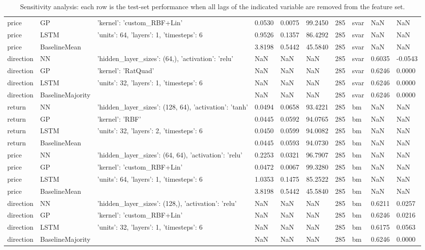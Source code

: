 \begin{table}[H]
\begin{tabular}{llllllllll}
price & GP & {'kernel': 'custom_RBF+Lin'} & 0.0530 & 0.0075 & 99.2450 & 285 & svar & NaN & NaN \\
price & LSTM & {'units': 64, 'layers': 1, 'timesteps': 6} & 0.9526 & 0.1357 & 86.4292 & 285 & svar & NaN & NaN \\
price & BaselineMean & {} & 3.8198 & 0.5442 & 45.5840 & 285 & svar & NaN & NaN \\
direction & NN & {'hidden_layer_sizes': (64,), 'activation': 'relu'} & NaN & NaN & NaN & 285 & svar & 0.6035 & -0.0543 \\
direction & GP & {'kernel': 'RatQuad'} & NaN & NaN & NaN & 285 & svar & 0.6246 & 0.0000 \\
direction & LSTM & {'units': 32, 'layers': 1, 'timesteps': 6} & NaN & NaN & NaN & 285 & svar & 0.6246 & 0.0000 \\
direction & BaselineMajority & {} & NaN & NaN & NaN & 285 & svar & 0.6246 & 0.0000 \\
return & NN & {'hidden_layer_sizes': (128, 64), 'activation': 'tanh'} & 0.0494 & 0.0658 & 93.4221 & 285 & bm & NaN & NaN \\
return & GP & {'kernel': 'RBF'} & 0.0445 & 0.0592 & 94.0765 & 285 & bm & NaN & NaN \\
return & LSTM & {'units': 32, 'layers': 2, 'timesteps': 6} & 0.0450 & 0.0599 & 94.0082 & 285 & bm & NaN & NaN \\
return & BaselineMean & {} & 0.0445 & 0.0593 & 94.0730 & 285 & bm & NaN & NaN \\
price & NN & {'hidden_layer_sizes': (64, 64), 'activation': 'relu'} & 0.2253 & 0.0321 & 96.7907 & 285 & bm & NaN & NaN \\
price & GP & {'kernel': 'custom_RBF+Lin'} & 0.0472 & 0.0067 & 99.3280 & 285 & bm & NaN & NaN \\
price & LSTM & {'units': 64, 'layers': 1, 'timesteps': 6} & 1.0353 & 0.1475 & 85.2522 & 285 & bm & NaN & NaN \\
price & BaselineMean & {} & 3.8198 & 0.5442 & 45.5840 & 285 & bm & NaN & NaN \\
direction & NN & {'hidden_layer_sizes': (128,), 'activation': 'relu'} & NaN & NaN & NaN & 285 & bm & 0.6211 & 0.0257 \\
direction & GP & {'kernel': 'custom_RBF+Lin'} & NaN & NaN & NaN & 285 & bm & 0.6246 & 0.0216 \\
direction & LSTM & {'units': 32, 'layers': 1, 'timesteps': 6} & NaN & NaN & NaN & 285 & bm & 0.6175 & 0.0563 \\
direction & BaselineMajority & {} & NaN & NaN & NaN & 285 & bm & 0.6246 & 0.0000 \\
\bottomrule
\end{tabular}
\caption{Sensitivity analysis: each row is the test-set performance when all lags of the indicated variable are removed from the feature set.}
\label{tab:ex2_sensitivity}
\end{table}
